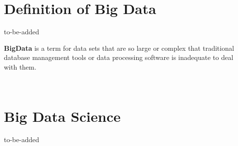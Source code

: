 \section{Definition of Big Data}
\label{bd_def}
to-be-added
\\[0.5 cm]
\hspace*{4mm}%
\hspace*{4mm}%
\begin{minipage}{0.8\textwidth}\raggedright
\textbf{BigData} is a term for data sets that are so large or complex that traditional database management tools or data processing software is inadequate to deal with them. \\
\end{minipage}\\[0.4 cm]

\section{Big Data Science}
\label{bd_science}
to-be-added